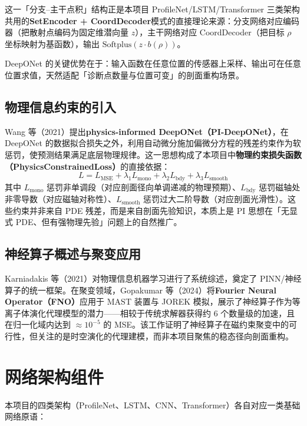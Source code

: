 \documentclass[12pt,a4paper]{article}
\begin{document}
这一「分支--主干点积」结构正是本项目 ProfileNet/LSTM/Transformer 三类架构共用的\textbf{SetEncoder + CoordDecoder}模式的直接理论来源：分支网络对应编码器（把散射点编码为固定维潜向量 $z$），主干网络对应 CoordDecoder（把目标 $\rho$ 坐标映射为基函数），输出 $\mathrm{Softplus}(z\cdot b(\rho))$。

DeepONet 的关键优势在于：输入函数在任意位置的传感器上采样、输出可在任意位置求值，天然适配「诊断点数量与位置可变」的剖面重构场景。

\subsection{物理信息约束的引入}

Wang 等（2021）提出\textbf{physics-informed DeepONet（PI-DeepONet）}，在 DeepONet 的数据拟合损失之外，利用自动微分施加偏微分方程的残差约束作为软惩罚，使预测结果满足底层物理规律。这一思想构成了本项目中\textbf{物理约束损失函数（PhysicsConstrainedLoss）}的直接依据：
\[
L = L_{\mathrm{MSE}} + \lambda_1 L_{\mathrm{mono}} + \lambda_2 L_{\mathrm{bdy}} + \lambda_3 L_{\mathrm{smooth}}
\]
其中 $L_{\mathrm{mono}}$ 惩罚非单调段（对应剖面径向单调递减的物理预期）、$L_{\mathrm{bdy}}$ 惩罚磁轴处非零导数（对应磁轴对称性）、$L_{\mathrm{smooth}}$ 惩罚过大二阶导数（对应剖面光滑性）。这些约束并非来自 PDE 残差，而是来自剖面先验知识，本质上是 PI 思想在「无显式 PDE、但有强物理先验」问题上的自然推广。

\subsection{神经算子概述与聚变应用}

Karniadakis 等（2021）对物理信息机器学习进行了系统综述，奠定了 PINN/神经算子的统一框架。在聚变领域，Gopakumar 等（2024）将\textbf{Fourier Neural Operator（FNO）}应用于 MAST 装置与 JOREK 模拟，展示了神经算子作为等离子体演化代理模型的潜力——相较于传统求解器获得约 6 个数量级的加速，且在归一化域内达到 $\approx 10^{-5}$ 的 MSE。该工作证明了神经算子在磁约束聚变中的可行性，但关注的是时空演化的代理建模，而非本项目聚焦的稳态径向剖面重构。

\section{网络架构组件}

本项目的四类架构（ProfileNet、LSTM、CNN、Transformer）各自对应一类基础网络原语：
\end{document}
